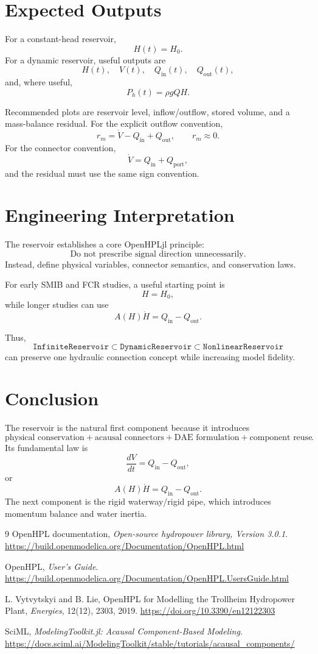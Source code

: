 \documentclass[11pt,a4paper]{article}
\begin{document}
\section{Expected Outputs}
For a constant-head reservoir,
\[
H(t)=H_0.
\]
For a dynamic reservoir, useful outputs are
\[
H(t),\quad V(t),\quad Q_{\mathrm{in}}(t),\quad Q_{\mathrm{out}}(t),
\]
and, where useful,
\[
P_h(t)=\rho gQH.
\]

Recommended plots are reservoir level, inflow/outflow, stored volume, and a mass-balance residual. For the explicit outflow convention,
\[
r_m=\dot V-Q_{\mathrm{in}}+Q_{\mathrm{out}},
\qquad
r_m\approx0.
\]
For the connector convention,
\[
\dot V=Q_{\mathrm{in}}+Q_{\mathrm{port}},
\]
and the residual must use the same sign convention.

\section{Engineering Interpretation}
The reservoir establishes a core OpenHPLjl principle:
\[
\boxed{\text{Do not prescribe signal direction unnecessarily.}}
\]
Instead, define physical variables, connector semantics, and conservation laws.

For early SMIB and FCR studies, a useful starting point is
\[
\boxed{H=H_0},
\]
while longer studies can use
\[
\boxed{A(H)\dot H=Q_{\mathrm{in}}-Q_{\mathrm{out}}}.
\]

Thus,
\[
\boxed{\texttt{InfiniteReservoir}\subset\texttt{DynamicReservoir}\subset\texttt{NonlinearReservoir}}
\]
can preserve one hydraulic connection concept while increasing model fidelity.

\section*{Conclusion}
The reservoir is the natural first component because it introduces
\[
\boxed{\text{physical conservation}+\text{acausal connectors}+\text{DAE formulation}+\text{component reuse}}.
\]
Its fundamental law is
\[
\boxed{\frac{dV}{dt}=Q_{\mathrm{in}}-Q_{\mathrm{out}}},
\]
or
\[
\boxed{A(H)\dot H=Q_{\mathrm{in}}-Q_{\mathrm{out}}}.
\]
The next component is the rigid waterway/rigid pipe, which introduces momentum balance and water inertia.

\begin{thebibliography}{9}
OpenHPL documentation, \emph{Open-source hydropower library, Version 3.0.1}.
\url{https://build.openmodelica.org/Documentation/OpenHPL.html}

OpenHPL, \emph{User's Guide}.
\url{https://build.openmodelica.org/Documentation/OpenHPL.UsersGuide.html}

L. Vytvytskyi and B. Lie,
OpenHPL for Modelling the Trollheim Hydropower Plant,
\emph{Energies}, 12(12), 2303, 2019.
\url{https://doi.org/10.3390/en12122303}

SciML, \emph{ModelingToolkit.jl: Acausal Component-Based Modeling}.
\url{https://docs.sciml.ai/ModelingToolkit/stable/tutorials/acausal_components/}
\end{thebibliography}
\end{document}
